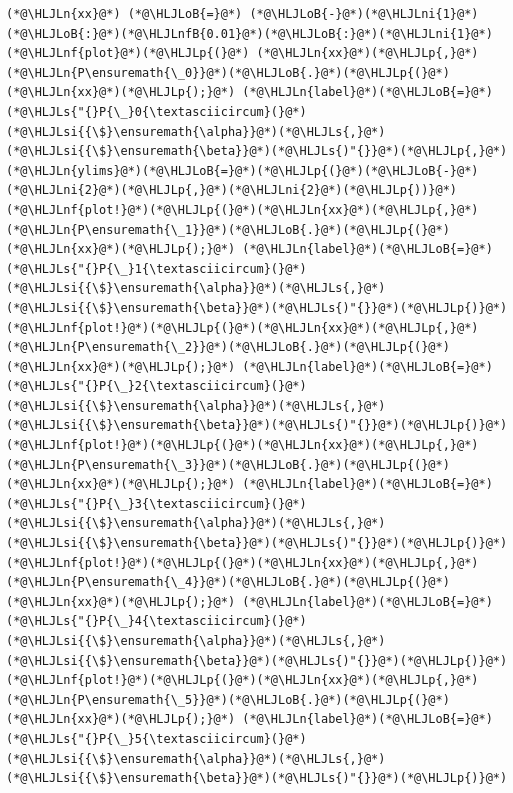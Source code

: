 \documentclass[12pt,a4paper]{article}
\newcommand{\HLJLn}[1]{#1}
\newcommand{\HLJLnf}[1]{\textcolor[RGB]{66,102,213}{#1}}
\newcommand{\HLJLs}[1]{\textcolor[RGB]{201,61,57}{#1}}
\newcommand{\HLJLsi}[1]{#1}
\newcommand{\HLJLnfB}[1]{\textcolor[RGB]{59,151,46}{#1}}
\newcommand{\HLJLni}[1]{\textcolor[RGB]{59,151,46}{#1}}
\newcommand{\HLJLoB}[1]{\textcolor[RGB]{102,102,102}{\textbf{#1}}}
\newcommand{\HLJLp}[1]{#1}
\begin{document}
\begin{lstlisting}
(*@\HLJLn{xx}@*) (*@\HLJLoB{=}@*) (*@\HLJLoB{-}@*)(*@\HLJLni{1}@*)(*@\HLJLoB{:}@*)(*@\HLJLnfB{0.01}@*)(*@\HLJLoB{:}@*)(*@\HLJLni{1}@*)
(*@\HLJLnf{plot}@*)(*@\HLJLp{(}@*) (*@\HLJLn{xx}@*)(*@\HLJLp{,}@*) (*@\HLJLn{P\ensuremath{\_0}}@*)(*@\HLJLoB{.}@*)(*@\HLJLp{(}@*)(*@\HLJLn{xx}@*)(*@\HLJLp{);}@*) (*@\HLJLn{label}@*)(*@\HLJLoB{=}@*)(*@\HLJLs{"{}P{\_}0{\textasciicircum}(}@*)(*@\HLJLsi{{\$}\ensuremath{\alpha}}@*)(*@\HLJLs{,}@*)(*@\HLJLsi{{\$}\ensuremath{\beta}}@*)(*@\HLJLs{)"{}}@*)(*@\HLJLp{,}@*) (*@\HLJLn{ylims}@*)(*@\HLJLoB{=}@*)(*@\HLJLp{(}@*)(*@\HLJLoB{-}@*)(*@\HLJLni{2}@*)(*@\HLJLp{,}@*)(*@\HLJLni{2}@*)(*@\HLJLp{))}@*)
(*@\HLJLnf{plot!}@*)(*@\HLJLp{(}@*)(*@\HLJLn{xx}@*)(*@\HLJLp{,}@*) (*@\HLJLn{P\ensuremath{\_1}}@*)(*@\HLJLoB{.}@*)(*@\HLJLp{(}@*)(*@\HLJLn{xx}@*)(*@\HLJLp{);}@*) (*@\HLJLn{label}@*)(*@\HLJLoB{=}@*)(*@\HLJLs{"{}P{\_}1{\textasciicircum}(}@*)(*@\HLJLsi{{\$}\ensuremath{\alpha}}@*)(*@\HLJLs{,}@*)(*@\HLJLsi{{\$}\ensuremath{\beta}}@*)(*@\HLJLs{)"{}}@*)(*@\HLJLp{)}@*)
(*@\HLJLnf{plot!}@*)(*@\HLJLp{(}@*)(*@\HLJLn{xx}@*)(*@\HLJLp{,}@*) (*@\HLJLn{P\ensuremath{\_2}}@*)(*@\HLJLoB{.}@*)(*@\HLJLp{(}@*)(*@\HLJLn{xx}@*)(*@\HLJLp{);}@*) (*@\HLJLn{label}@*)(*@\HLJLoB{=}@*)(*@\HLJLs{"{}P{\_}2{\textasciicircum}(}@*)(*@\HLJLsi{{\$}\ensuremath{\alpha}}@*)(*@\HLJLs{,}@*)(*@\HLJLsi{{\$}\ensuremath{\beta}}@*)(*@\HLJLs{)"{}}@*)(*@\HLJLp{)}@*)
(*@\HLJLnf{plot!}@*)(*@\HLJLp{(}@*)(*@\HLJLn{xx}@*)(*@\HLJLp{,}@*) (*@\HLJLn{P\ensuremath{\_3}}@*)(*@\HLJLoB{.}@*)(*@\HLJLp{(}@*)(*@\HLJLn{xx}@*)(*@\HLJLp{);}@*) (*@\HLJLn{label}@*)(*@\HLJLoB{=}@*)(*@\HLJLs{"{}P{\_}3{\textasciicircum}(}@*)(*@\HLJLsi{{\$}\ensuremath{\alpha}}@*)(*@\HLJLs{,}@*)(*@\HLJLsi{{\$}\ensuremath{\beta}}@*)(*@\HLJLs{)"{}}@*)(*@\HLJLp{)}@*)
(*@\HLJLnf{plot!}@*)(*@\HLJLp{(}@*)(*@\HLJLn{xx}@*)(*@\HLJLp{,}@*) (*@\HLJLn{P\ensuremath{\_4}}@*)(*@\HLJLoB{.}@*)(*@\HLJLp{(}@*)(*@\HLJLn{xx}@*)(*@\HLJLp{);}@*) (*@\HLJLn{label}@*)(*@\HLJLoB{=}@*)(*@\HLJLs{"{}P{\_}4{\textasciicircum}(}@*)(*@\HLJLsi{{\$}\ensuremath{\alpha}}@*)(*@\HLJLs{,}@*)(*@\HLJLsi{{\$}\ensuremath{\beta}}@*)(*@\HLJLs{)"{}}@*)(*@\HLJLp{)}@*)
(*@\HLJLnf{plot!}@*)(*@\HLJLp{(}@*)(*@\HLJLn{xx}@*)(*@\HLJLp{,}@*) (*@\HLJLn{P\ensuremath{\_5}}@*)(*@\HLJLoB{.}@*)(*@\HLJLp{(}@*)(*@\HLJLn{xx}@*)(*@\HLJLp{);}@*) (*@\HLJLn{label}@*)(*@\HLJLoB{=}@*)(*@\HLJLs{"{}P{\_}5{\textasciicircum}(}@*)(*@\HLJLsi{{\$}\ensuremath{\alpha}}@*)(*@\HLJLs{,}@*)(*@\HLJLsi{{\$}\ensuremath{\beta}}@*)(*@\HLJLs{)"{}}@*)(*@\HLJLp{)}@*)
\end{lstlisting}
\end{document}
